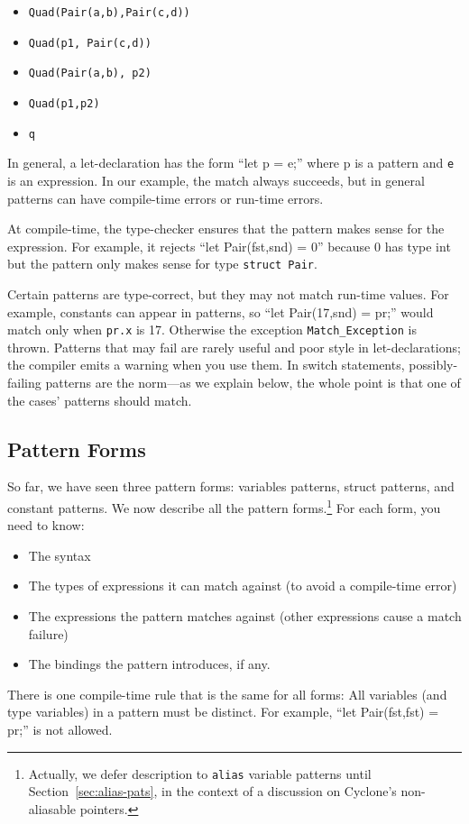 \begin{itemize}
\item \texttt{Quad(Pair(a,b),Pair(c,d))}
\item \texttt{Quad(p1, Pair(c,d))}
\item \texttt{Quad(Pair(a,b), p2)}
\item \texttt{Quad(p1,p2)}
\item \texttt{q}
\end{itemize}

In general, a let-declaration has the form ``let p = e;'' where p is a
pattern and \texttt{e} is an expression.  In our example, the match
always succeeds, but in general patterns can have compile-time errors
or run-time errors.

At compile-time, the type-checker ensures that the pattern makes sense
for the expression.  For example, it rejects ``let Pair(fst,snd) = 0''
because 0 has type int but the pattern only makes sense for type
\texttt{struct Pair}.

Certain patterns are type-correct, but they may not match run-time
values.  For example, constants can appear in patterns, so ``let
Pair(17,snd) = pr;'' would match only when \texttt{pr.x} is 17.
Otherwise the exception \texttt{Match_Exception} is thrown.  Patterns
that may fail are rarely useful and poor style in let-declarations;
the compiler emits a warning when you use them.  In switch statements,
possibly-failing patterns are the norm---as we explain below, the
whole point is that one of the cases' patterns should match.

\subsection{Pattern Forms}\hypertarget{pat_forms}{}

So far, we have seen three pattern forms: variables patterns, struct
patterns, and constant patterns.  We now describe all the pattern
forms.\footnote{Actually, we defer description to \texttt{alias} variable
patterns until Section~\ref{sec:alias-pats}, in the context of a discussion
on Cyclone's non-aliasable pointers.}  For each form, you need to know:

\begin{itemize}
\item The syntax
\item The types of expressions it can match against (to avoid a
  compile-time error)
\item The expressions the pattern matches against (other expressions
  cause a match failure)
\item The bindings the pattern introduces, if any.
\end{itemize}
There is one compile-time rule that is the same for all forms: All
variables (and type variables) in a pattern must be distinct.  For
example, ``let Pair(fst,fst) = pr;'' is not allowed.

